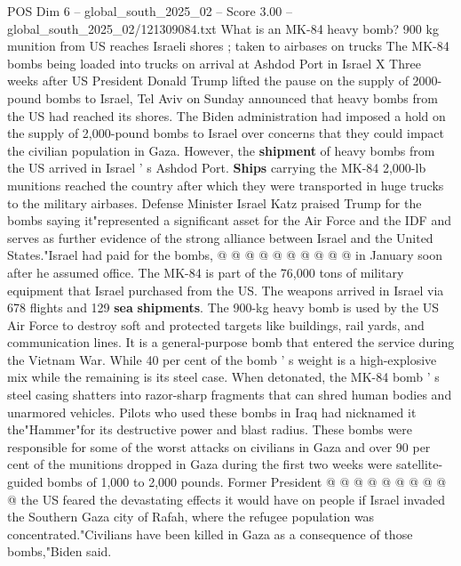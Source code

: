 \begin{textsample}{POS Dim 6 – global\_south\_2025\_02 – Score 3.00 – global\_south\_2025\_02/121309084.txt}  \label{ex:f6_pos_410}
What is an MK-84 heavy bomb? 900 kg munition from US reaches Israeli shores ; taken to airbases on trucks The MK-84 bombs being loaded into trucks on arrival at Ashdod Port in Israel X Three weeks after US President Donald Trump lifted the pause on the supply of 2000-pound bombs to Israel, Tel Aviv on Sunday announced that heavy bombs from the US had reached its shores.
The Biden administration had imposed a hold on the supply of 2,000-pound bombs to Israel over concerns that they could impact the civilian population in Gaza.
However, the \textbf{shipment} of heavy bombs from the US arrived in Israel ' s Ashdod Port. \textbf{Ships} carrying the MK-84 2,000-lb munitions reached the country after which they were transported in huge trucks to the military airbases.
Defense Minister Israel Katz praised Trump for the bombs saying it"represented a significant asset for the Air Force and the IDF and serves as further evidence of the strong alliance between Israel and the United States."Israel had paid for the bombs, @ @ @ @ @ @ @ @ @ @ in January soon after he assumed office.
The MK-84 is part of the 76,000 tons of military equipment that Israel purchased from the US.
The weapons arrived in Israel via 678 flights and 129 \textbf{sea} \textbf{shipments}.
The 900-kg heavy bomb is used by the US Air Force to destroy soft and protected targets like buildings, rail yards, and communication lines.
It is a general-purpose bomb that entered the service during the Vietnam War.
While 40 per cent of the bomb ' s weight is a high-explosive mix while the remaining is its steel case.
When detonated, the MK-84 bomb ' s steel casing shatters into razor-sharp fragments that can shred human bodies and unarmored vehicles.
Pilots who used these bombs in Iraq had nicknamed it the"Hammer"for its destructive power and blast radius.
These bombs were responsible for some of the worst attacks on civilians in Gaza and over 90 per cent of the munitions dropped in Gaza during the first two weeks were satellite-guided bombs of 1,000 to 2,000 pounds.
Former President @ @ @ @ @ @ @ @ @ @ the US feared the devastating effects it would have on people if Israel invaded the Southern Gaza city of Rafah, where the refugee population was concentrated."Civilians have been killed in Gaza as a consequence of those bombs,"Biden said.

\end{textsample}
